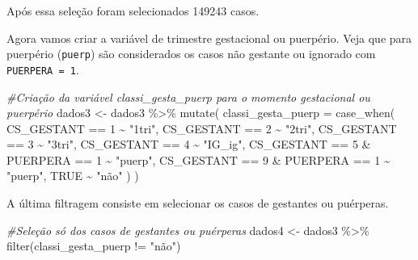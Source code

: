\documentclass[
]{article}
\newenvironment{Shaded}{\begin{snugshade}}{\end{snugshade}}
\newcommand{\AttributeTok}[1]{\textcolor[rgb]{0.77,0.63,0.00}{#1}}
\newcommand{\CommentTok}[1]{\textcolor[rgb]{0.56,0.35,0.01}{\textit{#1}}}
\newcommand{\ConstantTok}[1]{\textcolor[rgb]{0.00,0.00,0.00}{#1}}
\newcommand{\DecValTok}[1]{\textcolor[rgb]{0.00,0.00,0.81}{#1}}
\newcommand{\FunctionTok}[1]{\textcolor[rgb]{0.00,0.00,0.00}{#1}}
\newcommand{\NormalTok}[1]{#1}
\newcommand{\OtherTok}[1]{\textcolor[rgb]{0.56,0.35,0.01}{#1}}
\newcommand{\SpecialCharTok}[1]{\textcolor[rgb]{0.00,0.00,0.00}{#1}}
\newcommand{\StringTok}[1]{\textcolor[rgb]{0.31,0.60,0.02}{#1}}
\begin{document}
Após essa seleção foram selecionados 149243 casos.

Agora vamos criar a variável de trimestre gestacional ou puerpério. Veja
que para puerpério (\texttt{puerp}) são considerados os casos não
gestante ou ignorado com \texttt{PUERPERA\ =\ 1}.

\begin{Shaded}
\begin{Highlighting}[]
\CommentTok{\#Criação da variável classi\_gesta\_puerp para o momento gestacional ou puerpério}
\NormalTok{dados3 }\OtherTok{\textless{}{-}}\NormalTok{ dados3 }\SpecialCharTok{\%\textgreater{}\%}
  \FunctionTok{mutate}\NormalTok{(}
    \AttributeTok{classi\_gesta\_puerp =} \FunctionTok{case\_when}\NormalTok{(}
\NormalTok{      CS\_GESTANT }\SpecialCharTok{==} \DecValTok{1}  \SpecialCharTok{\textasciitilde{}} \StringTok{"1tri"}\NormalTok{,}
\NormalTok{      CS\_GESTANT }\SpecialCharTok{==} \DecValTok{2}  \SpecialCharTok{\textasciitilde{}} \StringTok{"2tri"}\NormalTok{,}
\NormalTok{      CS\_GESTANT }\SpecialCharTok{==} \DecValTok{3}  \SpecialCharTok{\textasciitilde{}} \StringTok{"3tri"}\NormalTok{,}
\NormalTok{      CS\_GESTANT }\SpecialCharTok{==} \DecValTok{4}  \SpecialCharTok{\textasciitilde{}} \StringTok{"IG\_ig"}\NormalTok{,}
\NormalTok{      CS\_GESTANT }\SpecialCharTok{==} \DecValTok{5} \SpecialCharTok{\&}
\NormalTok{        PUERPERA }\SpecialCharTok{==} \DecValTok{1} \SpecialCharTok{\textasciitilde{}} \StringTok{"puerp"}\NormalTok{,}
\NormalTok{      CS\_GESTANT }\SpecialCharTok{==} \DecValTok{9} \SpecialCharTok{\&}\NormalTok{ PUERPERA }\SpecialCharTok{==} \DecValTok{1} \SpecialCharTok{\textasciitilde{}} \StringTok{"puerp"}\NormalTok{,}
      \ConstantTok{TRUE} \SpecialCharTok{\textasciitilde{}} \StringTok{"não"}
\NormalTok{    )}
\NormalTok{  )}
\end{Highlighting}
\end{Shaded}

A última filtragem consiste em selecionar os casos de gestantes ou
puérperas.

\begin{Shaded}
\begin{Highlighting}[]
\CommentTok{\#Seleção só dos casos de gestantes ou puérperas}
\NormalTok{dados4 }\OtherTok{\textless{}{-}}\NormalTok{ dados3 }\SpecialCharTok{\%\textgreater{}\%}
  \FunctionTok{filter}\NormalTok{(classi\_gesta\_puerp }\SpecialCharTok{!=} \StringTok{"não"}\NormalTok{)}
\end{Highlighting}
\end{Shaded}
\end{document}
